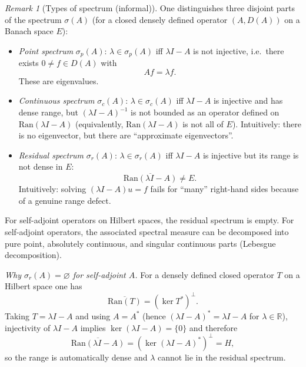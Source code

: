 \documentclass[11pt]{article}
\theoremstyle{definition}
\theoremstyle{remark}
\newtheorem{remark}{Remark}
\begin{document}
\begin{remark}[Types of spectrum (informal)]
One distinguishes three disjoint parts of the spectrum $\sigma(A)$ (for a closed densely defined operator $(A,D(A))$ on a Banach space $E$):
\begin{itemize}
    \item \emph{Point spectrum} $\sigma_p(A)$: $\lambda\in\sigma_p(A)$ iff $\lambda I-A$ is not injective, i.e.\ there exists $0\neq f\in D(A)$ with
    \[
        Af=\lambda f.
    \]
    These are eigenvalues.
    \item \emph{Continuous spectrum} $\sigma_c(A)$: $\lambda\in\sigma_c(A)$ iff $\lambda I-A$ is injective and has dense range, but $(\lambda I-A)^{-1}$ is not bounded as an operator defined on $\mathrm{Ran}(\lambda I-A)$ (equivalently, $\mathrm{Ran}(\lambda I-A)$ is not all of $E$).
    Intuitively: there is no eigenvector, but there are ``approximate eigenvectors''.
    \item \emph{Residual spectrum} $\sigma_r(A)$: $\lambda\in\sigma_r(A)$ iff $\lambda I-A$ is injective but its range is not dense in $E$:
    \[
        \overline{\mathrm{Ran}(\lambda I-A)}\neq E.
    \]
    Intuitively: solving $(\lambda I-A)u=f$ fails for ``many'' right-hand sides because of a genuine range defect.
\end{itemize}
For self-adjoint operators on Hilbert spaces, the residual spectrum is empty.
For self-adjoint operators, the associated spectral measure can be decomposed into pure point, absolutely continuous, and singular continuous parts (Lebesgue decomposition).
\smallskip

\emph{Why $\sigma_r(A)=\varnothing$ for self-adjoint $A$.}
For a densely defined closed operator $T$ on a Hilbert space one has
\[
    \overline{\mathrm{Ran}(T)} = (\ker T^*)^\perp.
\]
Taking $T=\lambda I-A$ and using $A=A^*$ (hence $(\lambda I-A)^*=\lambda I-A$ for $\lambda\in\mathbb{R}$), injectivity of $\lambda I-A$ implies $\ker(\lambda I-A)=\{0\}$ and therefore
\[
    \overline{\mathrm{Ran}(\lambda I-A)} = (\ker(\lambda I-A)^*)^\perp = H,
\]
so the range is automatically dense and $\lambda$ cannot lie in the residual spectrum.
\smallskip


\end{remark}
\end{document}
